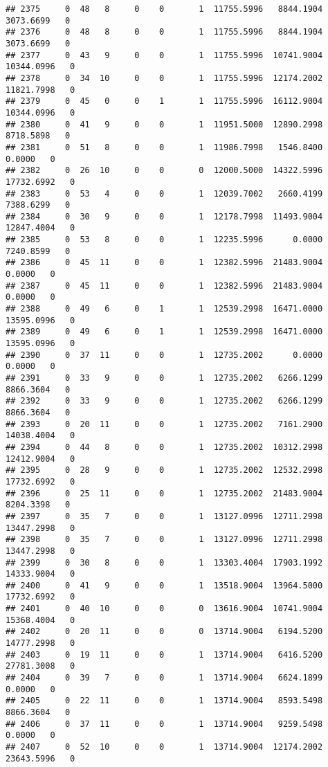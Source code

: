 \documentclass[
]{article}
\begin{document}
\begin{enumerate}
\begin{verbatim}
## 2375     0  48   8     0    0       1  11755.5996   8844.1904   3073.6699   0
## 2376     0  48   8     0    0       1  11755.5996   8844.1904   3073.6699   0
## 2377     0  43   9     0    0       1  11755.5996  10741.9004  10344.0996   0
## 2378     0  34  10     0    0       1  11755.5996  12174.2002  11821.7998   0
## 2379     0  45   0     0    1       1  11755.5996  16112.9004  10344.0996   0
## 2380     0  41   9     0    0       1  11951.5000  12890.2998   8718.5898   0
## 2381     0  51   8     0    0       1  11986.7998   1546.8400      0.0000   0
## 2382     0  26  10     0    0       0  12000.5000  14322.5996  17732.6992   0
## 2383     0  53   4     0    0       1  12039.7002   2660.4199   7388.6299   0
## 2384     0  30   9     0    0       1  12178.7998  11493.9004  12847.4004   0
## 2385     0  53   8     0    0       1  12235.5996      0.0000   7240.8599   0
## 2386     0  45  11     0    0       1  12382.5996  21483.9004      0.0000   0
## 2387     0  45  11     0    0       1  12382.5996  21483.9004      0.0000   0
## 2388     0  49   6     0    1       1  12539.2998  16471.0000  13595.0996   0
## 2389     0  49   6     0    1       1  12539.2998  16471.0000  13595.0996   0
## 2390     0  37  11     0    0       1  12735.2002      0.0000      0.0000   0
## 2391     0  33   9     0    0       1  12735.2002   6266.1299   8866.3604   0
## 2392     0  33   9     0    0       1  12735.2002   6266.1299   8866.3604   0
## 2393     0  20  11     0    0       1  12735.2002   7161.2900  14038.4004   0
## 2394     0  44   8     0    0       1  12735.2002  10312.2998  12412.9004   0
## 2395     0  28   9     0    0       1  12735.2002  12532.2998  17732.6992   0
## 2396     0  25  11     0    0       1  12735.2002  21483.9004   8204.3398   0
## 2397     0  35   7     0    0       1  13127.0996  12711.2998  13447.2998   0
## 2398     0  35   7     0    0       1  13127.0996  12711.2998  13447.2998   0
## 2399     0  30   8     0    0       1  13303.4004  17903.1992  14333.9004   0
## 2400     0  41   9     0    0       1  13518.9004  13964.5000  17732.6992   0
## 2401     0  40  10     0    0       0  13616.9004  10741.9004  15368.4004   0
## 2402     0  20  11     0    0       0  13714.9004   6194.5200  14777.2998   0
## 2403     0  19  11     0    0       1  13714.9004   6416.5200  27781.3008   0
## 2404     0  39   7     0    0       1  13714.9004   6624.1899      0.0000   0
## 2405     0  22  11     0    0       1  13714.9004   8593.5498   8866.3604   0
## 2406     0  37  11     0    0       1  13714.9004   9259.5498      0.0000   0
## 2407     0  52  10     0    0       1  13714.9004  12174.2002  23643.5996   0

\end{verbatim}
\end{enumerate}
\end{document}
